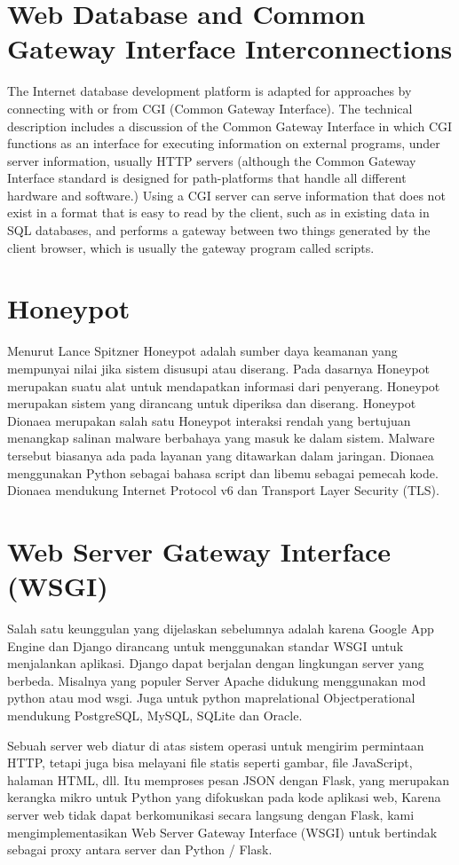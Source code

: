 \section{ Web Database and Common Gateway Interface Interconnections }
The Internet database development platform is adapted for approaches by connecting with or from CGI (Common Gateway Interface). The technical description includes a discussion of the Common Gateway Interface in which CGI functions as an interface for executing information on external programs, under server information, usually HTTP servers (although the Common Gateway Interface standard is designed for path-platforms that handle all different hardware and software.) Using a CGI server can serve information that does not exist in a format that is easy to read by the client, such as in existing data in SQL databases, and performs a gateway between two things generated by the client browser, which is usually the gateway program called scripts.


\section{Honeypot}
Menurut Lance Spitzner Honeypot adalah sumber daya keamanan yang mempunyai nilai jika sistem disusupi atau diserang. Pada dasarnya Honeypot merupakan suatu alat untuk mendapatkan informasi dari penyerang. Honeypot merupakan sistem yang dirancang untuk diperiksa dan diserang.
Honeypot Dionaea merupakan salah satu Honeypot interaksi rendah yang bertujuan menangkap salinan malware berbahaya yang masuk ke dalam sistem. Malware tersebut biasanya ada pada layanan yang ditawarkan dalam jaringan. Dionaea menggunakan Python sebagai bahasa script dan libemu sebagai pemecah kode. Dionaea mendukung Internet Protocol v6 dan Transport Layer Security (TLS)\cite{andros2015implementasi}.

\section{Web Server Gateway Interface (WSGI) }
Salah satu keunggulan yang dijelaskan sebelumnya adalah karena Google App Engine dan Django dirancang untuk menggunakan standar WSGI untuk menjalankan aplikasi.
Django dapat berjalan dengan lingkungan server yang berbeda. Misalnya yang populer Server Apache didukung menggunakan mod python atau mod wsgi.
Juga untuk python maprelational Objectperational mendukung PostgreSQL, MySQL, SQLite dan Oracle.

\par Sebuah server web diatur di atas sistem operasi untuk mengirim permintaan HTTP, tetapi juga bisa melayani file statis seperti gambar, file JavaScript, halaman HTML, dll.
 Itu memproses pesan JSON dengan Flask, yang merupakan kerangka mikro untuk Python yang difokuskan pada kode aplikasi web, Karena server web tidak dapat berkomunikasi
 secara langsung dengan Flask, kami mengimplementasikan Web Server Gateway Interface (WSGI) untuk bertindak sebagai proxy antara server dan Python / Flask.


